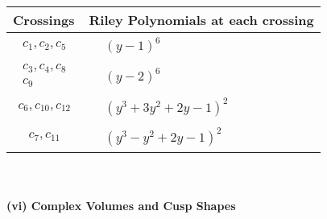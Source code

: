 \documentclass[1p]{elsarticle_modified}
\theoremstyle{definition}
\begin{document}
\begin{tabular}{m{50pt}|m{274pt}}
Crossings & \hspace{64pt}Riley Polynomials at each crossing \\
\hline $$\begin{aligned}c_{1},c_{2},c_{5}\end{aligned}$$&$\begin{aligned}
&(y-1)^6
\end{aligned}$\\
\hline $$\begin{aligned}c_{3},c_{4},c_{8}\\c_{9}\end{aligned}$$&$\begin{aligned}
&(y-2)^6
\end{aligned}$\\
\hline $$\begin{aligned}c_{6},c_{10},c_{12}\end{aligned}$$&$\begin{aligned}
&(y^3+3 y^2+2 y-1)^2
\end{aligned}$\\
\hline $$\begin{aligned}c_{7},c_{11}\end{aligned}$$&$\begin{aligned}
&(y^3- y^2+2 y-1)^2
\end{aligned}$\\
\hline
\end{tabular}\\~\\
\newpage\flushleft \textbf{(vi) Complex Volumes and Cusp Shapes}
\end{document}
